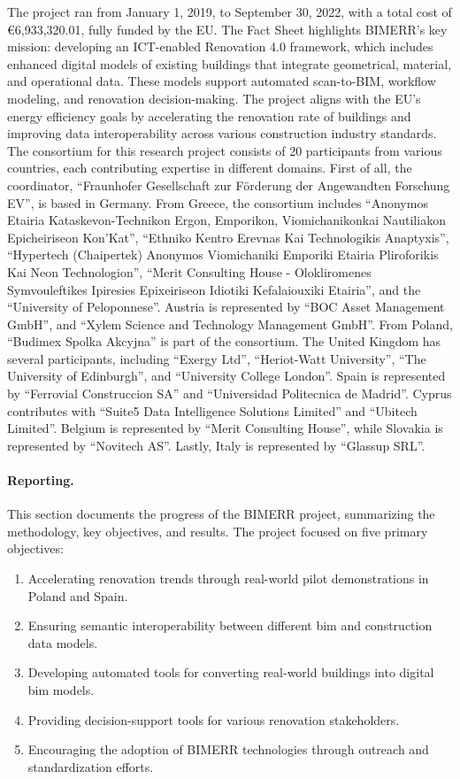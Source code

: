 The project ran from January 1, 2019, to September 30, 2022, with a total cost of \euro 6,933,320.01, fully funded by the EU.
The Fact Sheet highlights BIMERR's key mission: developing an ICT-enabled Renovation 4.0 framework, which includes enhanced digital models of existing buildings that integrate geometrical, material, and operational data.
These models support automated scan-to-BIM, workflow modeling, and renovation decision-making.
The project aligns with the EU's energy efficiency goals by accelerating the renovation rate of buildings and improving data interoperability across various construction industry standards.
The consortium for this research project consists of 20 participants from various countries, each contributing expertise in different domains.
First of all, the coordinator, ``Fraunhofer Gesellschaft zur F\"orderung der Angewandten Forschung EV'', is based in Germany.
From Greece, the consortium includes ``Anonymos Etairia Kataskevon-Technikon Ergon, Emporikon, Viomichanikonkai Nautiliakon Epicheiriseon Kon'Kat'', ``Ethniko Kentro Erevnas Kai Technologikis Anaptyxis'', ``Hypertech (Chaipertek) Anonymos Viomichaniki Emporiki Etairia Pliroforikis Kai Neon Technologion'', ``Merit Consulting House - Olokliromenes Symvouleftikes Ipiresies Epixeiriseon Idiotiki Kefalaiouxiki Etairia'', and the ``University of Peloponnese''.
Austria is represented by ``BOC Asset Management GmbH'', and ``Xylem Science and Technology Management GmbH''.
From Poland, ``Budimex Spolka Akcyjna'' is part of the consortium.
The United Kingdom has several participants, including ``Exergy Ltd'', ``Heriot-Watt University'', ``The University of Edinburgh'', and ``University College London''.
Spain is represented by ``Ferrovial Construccion SA'' and ``Universidad Politecnica de Madrid''.
Cyprus contributes with ``Suite5 Data Intelligence Solutions Limited'' and ``Ubitech Limited''.
Belgium is represented by ``Merit Consulting House'', while Slovakia is represented by ``Novitech AS''.
Lastly, Italy is represented by ``Glassup SRL''.

\paragraph*{Reporting.}
This section documents the progress of the BIMERR project, summarizing the methodology, key objectives, and results.
The project focused on five primary objectives:
\begin{enumerate}
    \item Accelerating renovation trends through real-world pilot demonstrations in Poland and Spain.
    \item Ensuring semantic interoperability between different \gls{bim} and construction data models.
    \item Developing automated tools for converting real-world buildings into digital \gls{bim} models.
    \item Providing decision-support tools for various renovation stakeholders.
    \item Encouraging the adoption of BIMERR technologies through outreach and standardization efforts.
\end{enumerate}


